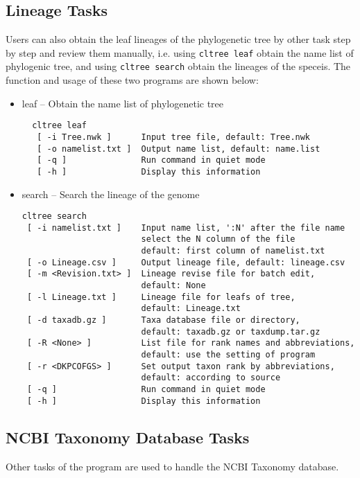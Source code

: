\documentclass[12pt,a4paper]{article}
\begin{document}
\subsection{Lineage Tasks}
Users can also obtain the leaf lineages of the phylogenetic tree by other task step by step and review them manually, i.e. using {\tt cltree leaf} obtain the name list of phylogenic tree, and using {\tt cltree search} obtain the lineages of the speceis. The function and usage of these two programs are shown below: 
 
\begin{itemize}\itemsep 0pt 
  \item leaf -- Obtain the name list of phylogenetic tree
  \begin{verbatim}
  cltree leaf
   [ -i Tree.nwk ]      Input tree file, default: Tree.nwk
   [ -o namelist.txt ]  Output name list, default: name.list
   [ -q ]               Run command in quiet mode
   [ -h ]               Display this information
  \end{verbatim}

\item search -- Search the lineage of the genome
\begin{verbatim}
cltree search
 [ -i namelist.txt ]    Input name list, ':N' after the file name
                        select the N column of the file
                        default: first column of namelist.txt
 [ -o Lineage.csv ]     Output lineage file, default: lineage.csv
 [ -m <Revision.txt> ]  Lineage revise file for batch edit,
                        default: None
 [ -l Lineage.txt ]     Lineage file for leafs of tree,
                        default: Lineage.txt
 [ -d taxadb.gz ]       Taxa database file or directory,
                        default: taxadb.gz or taxdump.tar.gz
 [ -R <None> ]          List file for rank names and abbreviations,
                        default: use the setting of program
 [ -r <DKPCOFGS> ]      Set output taxon rank by abbreviations,
                        default: according to source
 [ -q ]                 Run command in quiet mode
 [ -h ]                 Display this information
\end{verbatim}
\end{itemize}

\subsection{NCBI Taxonomy Database Tasks}
Other tasks of the program are used to handle the NCBI Taxonomy database.
\end{document}
